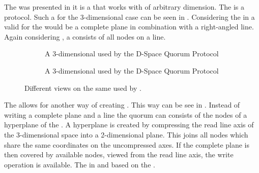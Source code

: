 \documentclass[conference]{IEEEtran}
\begin{document}
The  was presented in \cite{SKB04:mdq}
\cite{kuag:ggqcrcp:2011, KumarMUGQ:11} it is a  that works with 
of arbitrary dimension.
The  is a  protocol.
Such a  for the 3-dimensional case can be seen in .
Considering the  in  a valid  for the 
would be a complete plane in combination with a right-angled line.
Again considering , a  consists of all nodes on a line.
\begin{figure*}[ht]
	\begin{subfigure}[t]{0.48\linewidth}
	\centering
	
	\caption{A 3-dimensional  used by the D-Space Quorum Protocol}
	\label{fig:dspace}
	\end{subfigure}%
	\begin{subfigure}[t]{0.48\linewidth}
	\centering
	
	\caption{A 3-dimensional  used by the D-Space Quorum Protocol}
	\label{fig:dspace2}
	\end{subfigure}
	\caption{Different views on the same  used by .}
\end{figure*}
The  allows for another way of creating .
This way can be see in .
Instead of writing a complete plane and a line the quorum can consists of the
nodes of a hyperplane of the  \cite{beutelspacher1998projective}.
A hyperplane is created by compressing the read line axis of the 3-dimensional
space into a 2-dimensional plane.
This joins all nodes which share the same coordinates on the uncompressed
axes.
If the complete plane is then covered by available nodes, viewed from the read
line axis, the write operation is available.
The  in  and  based
on the .
\end{document}
